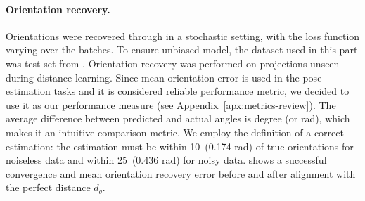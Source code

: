 \paragraph{Orientation recovery.}
Orientations were recovered through  in a stochastic setting, with the loss function varying over the batches.
To ensure unbiased model, the dataset used in this part was test set from .
Orientation recovery was performed on projections unseen during distance learning.
Since mean orientation error is used in the pose estimation tasks and it is considered reliable performance metric, we decided to use it as our performance measure (see Appendix~\ref{apx:metrics-review}). The average difference between predicted and actual angles is degree (or rad), which makes it an intuitive comparison metric. 
We employ the definition of a correct estimation: the estimation must be within 10\degree~(0.174 rad) of true orientations for noiseless data and within 25\degree~(0.436 rad) for noisy data.
 shows a successful convergence and mean orientation recovery error before and after alignment with the perfect distance $d_q$.










